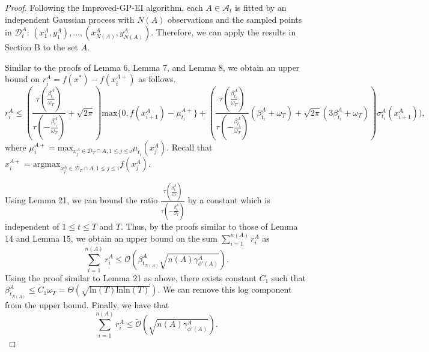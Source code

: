\documentclass[10pt,a4paper]{amsart}
\begin{document}
\begin{proof}
Following the Improved-GP-EI algorithm, each $A \in \mathcal A_t$ is fitted by an independent Gaussian process with $N(A)$ observations and the sampled points in $\mathcal D_t^A$: $(x_1^A,y_1^A), ..., (x_{N(A)}^A,y_{N(A)}^A)$. Therefore, we can apply the results in Section B to the set $A$.

Similar to the proofs of Lemma 6, Lemma 7, and Lemma 8, we obtain an upper bound on $r^A_i = f(x^*) - f(x^{A+}_i)$ as follows.
$$r^A_i \le (\frac{\tau(\frac{\beta^{A}_{t_i}}{\omega_T})}{ \tau(-\frac{\beta^{A}_{t_i}}{\omega_T})} + \sqrt{2\pi}) \text{max}\{0, f(x^A_{i+1}) - \mu^{A+}_{t_i}\} + (\frac{\tau(\frac{\beta^{A}_{t_i}}{\omega_T})}{ \tau(-\frac{\beta^{A}_{t_i}}{\omega_T})}(\beta^{A}_{t_i} + \omega_T) + \sqrt{2\pi}(3\beta^{A}_{t_i} + \omega_T))\sigma^A_{t_i}(x^A_{i+1})),$$
where $\mu^{A+}_i = \text{max}_{x^A_j \in \mathcal D_T \cap A, 1\le j \le i} \mu_{t_i}(x^A_j)$. Recall that $x^{A+}_i = \text{argmax}_{x^A_j \in \mathcal D_T \cap A, 1\le j \le i} f(x^A_j)$.

Using Lemma 21, we can bound the ratio $\frac{\tau(\frac{\beta^A_{t_i}}{\omega_T})}{ \tau(-\frac{\beta^A_{t_i}}{\omega_T})}$ by a constant which is independent of $1 \le t\le T$ and $T$. Thus, by the proofs similar to those of Lemma 14 and Lemma 15, we obtain an upper bound on the sum $\sum_{i=1}^{n(A)}r^A_i$ as
$$\sum_{i=1}^{n(A)}r^A_i \le \mathcal O(\beta^A_{t_{N(A)}}\sqrt{n(A)\gamma^A_{\phi'(A)}}).$$
Using the proof similar to Lemma 21 as above, there exists constant $C_1$ such that $\beta^A_{t_{N(A)}} \le C_1\omega_T = \Theta(\sqrt{\text{ln}(T)\text{ln} \text{ln}(T)})$. We can remove this log component from the upper bound. Finally, we have that
$$\sum_{i=1}^{n(A)}r^A_i \le \tilde{\mathcal O}(\sqrt{n(A)\gamma^A_{\phi'(A)}}).$$
\end{proof}
\end{document}

